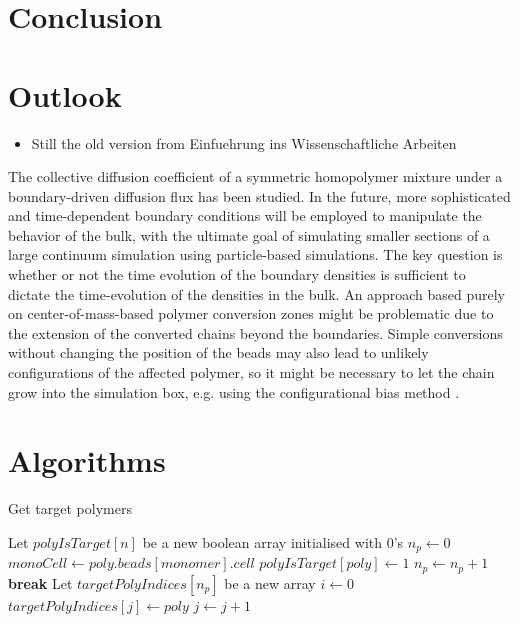 \documentclass[bachelor,       %
               twoside,        %
               BCOR10mm,       %
               ngerman, english %
               ]{GAUBM}
\begin{document}
\chapter{Conclusion}
 
\chapter{Outlook}

\begin{itemize}
    \item Still the old version from Einfuehrung ins Wissenschaftliche Arbeiten
\end{itemize}

The collective diffusion coefficient of a symmetric homopolymer mixture under a boundary-driven diffusion flux has been studied. In the future, more sophisticated and time-dependent boundary conditions will be employed to manipulate the behavior of the bulk, with the ultimate goal of simulating smaller sections of a large continuum simulation using particle-based simulations. The key question is whether or not the time evolution of the boundary densities is sufficient to dictate the time-evolution of the densities in the bulk. An approach based purely on center-of-mass-based polymer conversion zones might be problematic due to the extension of the converted chains beyond the boundaries. Simple conversions without changing the position of the beads may also lead to unlikely configurations of the affected polymer, so it might be necessary to let the chain grow into the simulation box, e.g. using the configurational bias method \cite{ConfBias}.
\appendix

\chapter{Algorithms}


\begin{algorithm}
\caption{Get target polymers}\label{alg:get_flip_candidates}
\begin{algorithmic}[1]
\State Let $polyIsTarget[n]$ be a new boolean array initialised with $0$'s
\State $n_p\gets 0$
        \State $monoCell\gets poly.beads[monomer].cell$
            \State $polyIsTarget[poly]\gets 1$
            \State $n_p\gets n_p+1$
            \State \textbf{break}
        \EndIf
    \EndFor
\EndFor
\State Let $targetPolyIndices[n_p]$ be a new array
\State $i\gets 0$
        \State $targetPolyIndices[j]\gets poly$
        \State $j\gets j+1$
    \EndIf
\EndFor
\end{algorithmic}
\end{algorithm}
\end{document}
